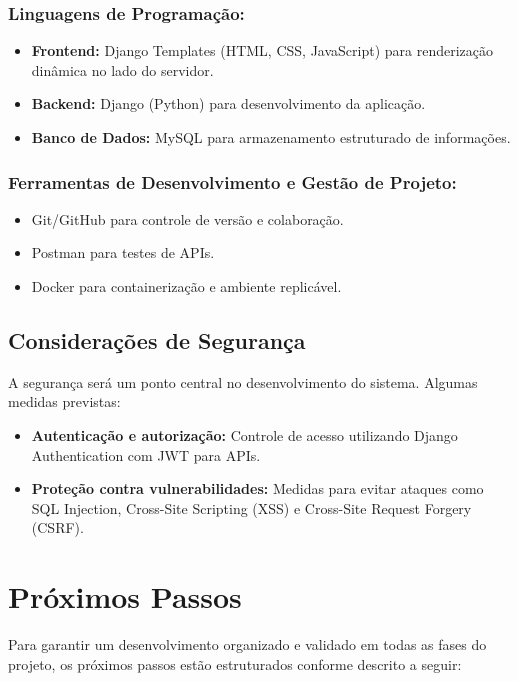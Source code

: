 \documentclass[12pt]{article}
\begin{document}
\subsubsection*{Linguagens de Programação:}
\begin{itemize}
\item \textbf{Frontend:} Django Templates (HTML, CSS, JavaScript) para renderização dinâmica no lado do servidor.
\item \textbf{Backend:} Django (Python) para desenvolvimento da aplicação.
\item \textbf{Banco de Dados:} MySQL para armazenamento estruturado de informações.
\end{itemize}

\subsubsection*{Ferramentas de Desenvolvimento e Gestão de Projeto:}
\begin{itemize}
\item Git/GitHub para controle de versão e colaboração.
\item Postman para testes de APIs.
\item Docker para containerização e ambiente replicável.
\end{itemize}

\subsection{Considerações de Segurança}

A segurança será um ponto central no desenvolvimento do sistema. Algumas medidas previstas:
\begin{itemize}
\item \textbf{Autenticação e autorização:} Controle de acesso utilizando Django Authentication com JWT para APIs.
\item \textbf{Proteção contra vulnerabilidades:} Medidas para evitar ataques como SQL Injection, Cross-Site Scripting (XSS) e Cross-Site Request Forgery (CSRF).
\end{itemize}

\newpage

\section{Próximos Passos}

Para garantir um desenvolvimento organizado e validado em todas as fases do projeto, os próximos passos estão estruturados conforme descrito a seguir:
\end{document}
